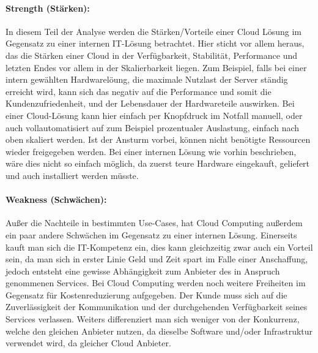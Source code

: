 \paragraph{Strength (Stärken):} In diesem Teil der Analyse werden die Stärken/Vorteile einer Cloud Lösung im Gegensatz zu einer internen IT-Lösung betrachtet. Hier sticht vor allem heraus, das die Stärken einer Cloud in der Verfügbarkeit, Stabilität, Performance und letzten Endes vor allem in der Skalierbarkeit liegen. Zum Beispiel, falls bei einer intern gewählten Hardwarelöung, die maximale Nutzlast der Server ständig erreicht wird, kann sich das negativ auf die Performance und somit die Kundenzufriedenheit, und der Lebensdauer der Hardwareteile auswirken. Bei einer Cloud-Lösung kann hier einfach per Knopfdruck im Notfall manuell, oder auch vollautomatisiert auf zum Beispiel prozentualer Auslastung, einfach nach oben skaliert werden. Ist der Ansturm vorbei, können nicht benötigte Ressourcen wieder freigegeben werden.
Bei einer internen Lösung wie vorhin beschrieben, wäre dies nicht so einfach möglich, da zuerst teure Hardware eingekauft, geliefert und auch installiert werden müsste.\\

\paragraph{Weakness (Schwächen):} Außer die Nachteile in bestimmten Use-Cases, hat Cloud Computing außerdem ein paar andere Schwächen im Gegensatz zu einer internen Lösung. Einerseits kauft man sich die IT-Kompetenz ein, dies kann gleichzeitig zwar auch ein Vorteil sein, da man sich in erster Linie Geld und Zeit spart im Falle einer Anschaffung, jedoch entsteht eine gewisse Abhängigkeit zum Anbieter des in Anspruch genommenen Services. Bei Cloud Computing werden noch weitere Freiheiten im Gegensatz für Kostenreduzierung aufgegeben. Der Kunde muss sich auf die Zuverlässigkeit der Kommunikation und der durchgehenden Verfügbarkeit seines Services verlassen. Weiters differenziert man sich weniger von der Konkurrenz, welche den gleichen Anbieter nutzen, da dieselbe Software und/oder Infrastruktur verwendet wird, da gleicher Cloud Anbieter.\\

